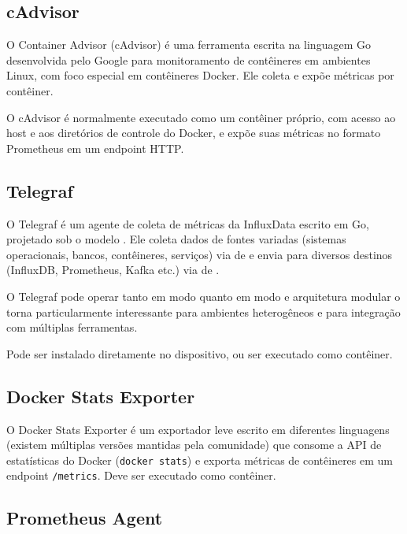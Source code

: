 \subsection{cAdvisor}
\label{subsection:cAdvisor}

O Container Advisor (cAdvisor) \citep{cadvisor2025} é uma ferramenta escrita na linguagem Go desenvolvida pelo Google para monitoramento de contêineres em ambientes Linux, com foco especial em contêineres Docker. Ele coleta e expõe métricas por contêiner.

O cAdvisor é normalmente executado como um contêiner próprio, com acesso ao host e aos diretórios de controle do Docker, e expõe suas métricas no formato Prometheus em um endpoint HTTP.

\subsection{Telegraf}
\label{subsection:Telegraf}

O Telegraf \citep{telegraf2025} é um agente de coleta de métricas da InfluxData escrito em Go, projetado sob o modelo . Ele coleta dados de fontes variadas (sistemas operacionais, bancos, contêineres, serviços) via  de  e envia para diversos destinos (InfluxDB, Prometheus, Kafka etc.) via  de .

O Telegraf pode operar tanto em modo  quanto em modo  e arquitetura modular o torna particularmente interessante para ambientes heterogêneos e para integração com múltiplas ferramentas.

Pode ser instalado diretamente no dispositivo, ou ser executado como contêiner.

\subsection{Docker Stats Exporter}
\label{subsection:DockerStatsExporter}

O Docker Stats Exporter \citep{dockerstatsexporter2025} é um exportador leve escrito em diferentes linguagens (existem múltiplas versões mantidas pela comunidade) que consome a API de estatísticas do Docker (\verb|docker stats|) e exporta métricas de contêineres em um endpoint \verb|/metrics|. 
Deve ser executado como contêiner.

\subsection{Prometheus Agent}
\label{subsection:PrometheusAgent}

